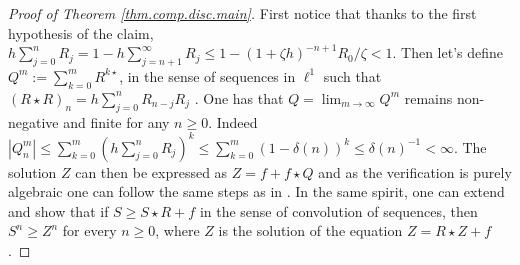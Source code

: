 \documentclass[]{jnsao}
\renewcommand{\tr}{R}
\begin{document}
 \begin{proof}[Proof of Theorem \ref{thm.comp.disc.main}]
 	First notice that thanks to the first hypothesis of the claim, 
	$h\sum_{j=0}^n \tr_j = 1 - h\sum_{j=n+1}^\infty  \tr_j \leq 1 - (1+\zeta h)^{-n+1} \tr_0/\zeta < 1$.
 	Then let's define $Q^m := \sum_{k=0}^m R^{k\star}$,  in the sense of sequences in $\ell^1$ such that 
	$(R\star R)_n = h\sum_{j=0}^n R_{n-j} R_j$ . 
 	One has that $Q = \lim_{m\to \infty} Q^m$ remains non-negative and finite for any $n\geq 0$. 
 	Indeed 
 	$|Q^m_n| \leq \sum_{k= 0}^m (h \sum_{j=0}^n R_j )^k \leq  \sum_{k= 0}^m  (1-\delta(n))^k \leq \delta(n)^{-1} < \infty$. The solution $Z$ can then be expressed as $Z=f+f \star Q$ 
 	and as the verification is purely algebraic one can follow the same steps as in \cite[Theorem 2.3.5 p. 44]{grip}. 
 	In the same spirit, one can extend \cite[Lemma 9.8.3]{grip} and show that if $S \geq S\star \tr + f$ 
	in the sense of convolution of sequences, then $S^n\geq Z^n$  for every $n\geq 0$, 
	where $Z$ is the solution of the equation $Z=\tr \star Z +f$.  


\end{proof}
\end{document}
